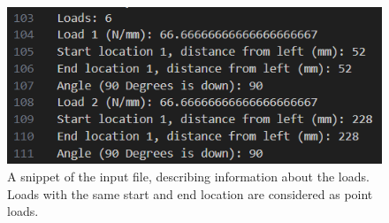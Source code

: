 \documentclass[11pt]{article}
\begin{document}
\begin{figure}[h]
\begin{minipage}[c]{0.45\linewidth}
\centering
\vspace{-5.5mm}
\includegraphics[scale = 0.55]{images/Screenshot 2024-11-25 223050.png}
\caption{A snippet of the input file, describing information about the loads. Loads with the same start and end location are considered as point loads.}
\end{minipage}
\end{figure}
\end{document}
